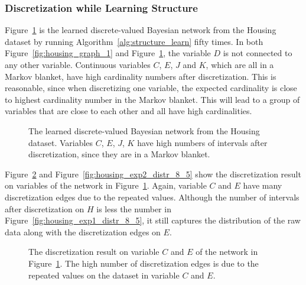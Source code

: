 \subsubsection{Discretization while Learning Structure}
\label{subsubsec:housing_exp2}

Figure~\ref{fig:housing_graph_2} is the learned discrete-valued Bayesian network from the Housing dataset by running Algorithm~\ref{alg:structure_learn} fifty times.
In both Figure~\ref{fig:housing_graph_1} and Figure~\ref{fig:housing_graph_2}, the variable $D$ is not connected to any other variable.
Continuous variables $C$, $E$, $J$ and $K$, which are all in a Markov blanket, have high cardinality numbers after discretization.
This is reasonable, since when discretizing one variable, the expected cardinality is close to highest cardinality number in the Markov blanket.
This will lead to a group of variables that are close to each other and all have high cardinalities.

\begin{figure}[ht]
    \centering
    \scalebox{0.8}{
      }
  \caption{The learned discrete-valued Bayesian network from the Housing dataset. Variables $C$, $E$, $J$, $K$ have high numbers of intervals after discretization, since they are in a Markov blanket.
  }
  \label{fig:housing_graph_2}
\end{figure}

Figure~\ref{fig:housing_exp2_distr_3_5} and Figure~\ref{fig:housing_exp2_distr_8_5} show the discretization result on variables of the network in Figure~\ref{fig:housing_graph_2}.
Again, variable $C$ and $E$ have many discretization edges due to the repeated values.
Although the number of intervals after discretization on $H$ is less the number in Figure~\ref{fig:housing_exp1_distr_8_5}, it still captures the distribution of the raw data along with the discretization edges on $E$.

\begin{figure}[ht]
\centering
      
  \caption{The discretization result on variable $C$ and $E$ of the network in Figure~\ref{fig:housing_graph_2}. The high number of discretization edges is due to the repeated values on the dataset in variable $C$ and $E$.}
  \label{fig:housing_exp2_distr_3_5}
\end{figure}

